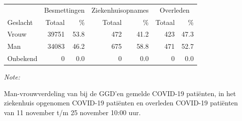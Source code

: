 \documentclass[
  english,
  man,floatsintext]{apa6}
\begin{document}
\begin{table}[H]
\centering\begingroup\fontsize{11}{13}\selectfont

\begin{threeparttable}
\begin{tabular}{lrrrrrr}
\toprule
\multicolumn{1}{c}{ } & \multicolumn{2}{c}{Besmettingen} & \multicolumn{2}{c}{Ziekenhuisopnames} & \multicolumn{2}{c}{Overleden} \\
\cmidrule(l{3pt}r{3pt}){2-3} \cmidrule(l{3pt}r{3pt}){4-5} \cmidrule(l{3pt}r{3pt}){6-7}
Geslacht & Totaal & \% & Totaal & \% & Totaal & \%\\
\midrule
Vrouw & 39751 & 53.8 & 472 & 41.2 & 423 & 47.3\\
Man & 34083 & 46.2 & 675 & 58.8 & 471 & 52.7\\
Onbekend & 0 & 0.0 & 0 & 0.0 & 0 & 0.0\\
\bottomrule
\end{tabular}
\begin{tablenotes}
\item \textit{Note: } 
\item Man-vrouwverdeling van bij de GGD’en gemelde COVID-19 patiënten, in het ziekenhuis opgenomen COVID-19 patiënten en overleden COVID-19 patiënten van 11 november t/m 25 november 10:00 uur.
\end{tablenotes}
\end{threeparttable}
\endgroup{}
\end{table}
\newpage
\end{document}
